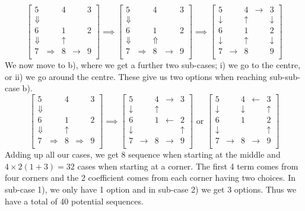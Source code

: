 \documentclass[11pt]{article}
\newcommand{\keywordfont}{\textsc}
\newcommand{\keyword}[1]{%
  \marginpar{\raggedright\small\keywordfont{#1}}}
\begin{document}
\[
\begin{bmatrix}
5 & & 4 & & 3\\
\Downarrow  & & & & \\
6 & & 1 & & 2\\
\Downarrow & & \uparrow & & \\
7 & \Rightarrow & 8 & \rightarrow & 9\\
\end{bmatrix} \implies
\begin{bmatrix}
5 & & 4 & & 3\\
\Downarrow  & & & & \\
6 & & 1 & & 2\\
\Downarrow & & \Uparrow & & \\
7 & \Rightarrow & 8 & \rightarrow & 9\\
\end{bmatrix} \implies
\begin{bmatrix}
5 & & 4 & \rightarrow & 3\\
\downarrow & & \uparrow & & \downarrow \\
6 & & 1 & & 2\\
\downarrow & & \uparrow & & \downarrow \\
7 & \rightarrow & 8 & & 9\\
\end{bmatrix}
\]
We now move \keyword{Justify}to b), where we get a further two sub-cases; i) we go to the centre, or ii) we go around the centre. These give us two options when reaching sub-sub-case b).
\[
\begin{bmatrix}
5 & & 4 & & 3\\
\Downarrow  & & & & \\
6 & & 1 & & 2\\
\Downarrow & & \uparrow & & \\
7 & \Rightarrow & 8 & \Rightarrow & 9\\
\end{bmatrix} \implies
\begin{bmatrix}
5 & & 4 & \rightarrow & 3\\
\downarrow  & & \uparrow & & \\
6 & & 1 & \leftarrow & 2\\
\downarrow & &  & & \uparrow \\
7 & \rightarrow & 8 & \rightarrow & 9\\
\end{bmatrix} \text{     or     }
\begin{bmatrix}
5 & & 4 & \leftarrow & 3\\
\downarrow  & & \downarrow & & \uparrow \\
6 & & 1 & & 2\\
\downarrow & &  & & \uparrow \\
7 & \rightarrow & 8 & \rightarrow & 9\\
\end{bmatrix}
\]
Adding up all our \keyword{Check}cases, we get 8 sequence when starting at the middle and $4 \times 2(1 + 3) = 32$ cases when starting at a corner. The first 4 term comes from four corners and the 2 coefficient comes from each corner having two choices. In sub-case 1), we only have 1 option and in sub-case 2) we get 3 options. Thus we have a total of 40 potential sequences. 
\end{document}

